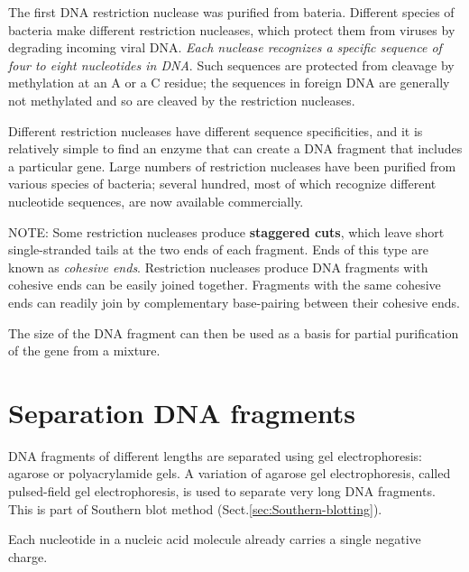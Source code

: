   The first DNA restriction nuclease was purified from bateria.
  Different species of bacteria make different restriction nucleases, which
  protect them from viruses by degrading incoming viral DNA. {\it Each nuclease
  recognizes a specific sequence of four to eight nucleotides in DNA}.
  Such sequences are protected from cleavage by methylation at an A or a C
  residue; the sequences in foreign DNA are generally not methylated and so are
  cleaved by the restriction nucleases. 
  
  Different restriction nucleases have different sequence specificities, and it
  is relatively simple to find an enzyme that can create a DNA fragment that
  includes a particular gene. Large numbers of restriction nucleases have been
  purified from various species of bacteria; several hundred, most of which
  recognize different nucleotide sequences, are now available commercially. 
  
  NOTE: Some restriction nucleases produce {\bf staggered cuts}, which leave
  short single-stranded tails at the two ends of each fragment.  Ends of this type are
  known as {\it cohesive ends}. Restriction nucleases produce DNA fragments with
  cohesive ends can be easily joined together. Fragments with the same cohesive
  ends can readily join by complementary base-pairing between their cohesive
  ends.
  
  
  The size of the DNA fragment can then be used as a basis for partial
  purification of the gene from a mixture.
  
\section{Separation DNA fragments}

DNA fragments of different lengths are separated using gel
electrophoresis: agarose or polyacrylamide gels.
A variation of agarose gel electrophoresis, called pulsed-field gel
electrophoresis, is used to separate very long DNA fragments.
This is part of Southern blot method (Sect.\ref{sec:Southern-blotting}).  
  
Each nucleotide in a nucleic acid molecule already carries a single negative
charge.

